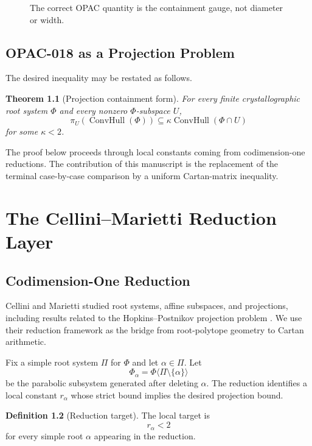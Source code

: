 \documentclass[11pt]{book}
\newtheorem{theorem}{Theorem}[chapter]
\theoremstyle{definition}
\newtheorem{definition}[theorem]{Definition}
\newcommand{\Conv}{\operatorname{ConvHull}}
\begin{document}
\begin{figure}[h]
\centering
{}
\caption{The correct OPAC quantity is the containment gauge, not diameter or width.}
\end{figure}

\chapter{OPAC-018 as a Projection Problem}
The desired inequality may be restated as follows.
\begin{theorem}[Projection containment form]
For every finite crystallographic root system $\Phi$ and every nonzero $\Phi$-subspace $U$,
\[
 \pi_U(\Conv(\Phi))\subseteq \kappa\Conv(\Phi\cap U)
\]
for some $\kappa<2$.
\end{theorem}
The proof below proceeds through local constants coming from codimension-one reductions. The contribution of this manuscript is the replacement of the terminal case-by-case comparison by a uniform Cartan-matrix inequality.

\part{The Cellini--Marietti Reduction Layer}

\chapter{Codimension-One Reduction}
Cellini and Marietti studied root systems, affine subspaces, and projections, including results related to the Hopkins--Postnikov projection problem \cite{cellini_marietti}. We use their reduction framework as the bridge from root-polytope geometry to Cartan arithmetic.

Fix a simple root system $\Pi$ for $\Phi$ and let $\alpha\in\Pi$. Let
\[
 \Phi_\alpha=\Phi\langle\Pi\setminus\{\alpha\}\rangle
\]
be the parabolic subsystem generated after deleting $\alpha$. The reduction identifies a local constant $r_\alpha$ whose strict bound implies the desired projection bound.
\begin{definition}[Reduction target]
The local target is
\[
 \boxed{r_\alpha<2}
\]
for every simple root $\alpha$ appearing in the reduction.
\end{definition}
\end{document}
